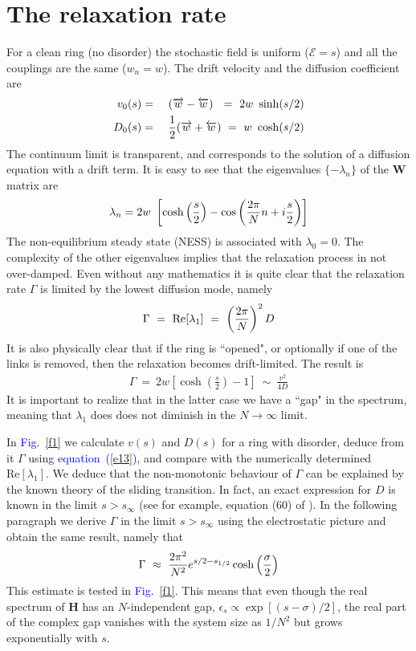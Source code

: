 \documentclass[aps,pre,floats,floatfix,twocolumn]{revtex4}
\newcommand{\re}{\mbox{Re}}
\newcommand{\ola}{\protect\overleftarrow}
\newcommand{\ora}{\protect\overrightarrow}
\newcommand{\be}[1]{\begin{eqnarray}\ifthenelse{#1=-1}{\nonumber}{\ifthenelse{#1=0}{}{\label{e#1}}}}
\newcommand{\beq}{\begin{eqnarray}}
\newcommand{\eeq}{\end{eqnarray}}
\newcommand{\Eq}[1]{\textcolor{blue}{{equation}\!~(\ref{#1})}}
\newcommand{\Fig}[1]{\textcolor{blue}{Fig.}\!\!~\ref{#1}}
\begin{document}
\section{The relaxation rate}

For a clean ring (no disorder) the stochastic field is uniform ($\mathcal{E}=s$) 
and all the couplings are the same ($w_n=w$). 
The drift velocity and the diffusion coefficient are
%
\beq
v_0(s) &=& \ (\ora{w}-\ola{w}) \ \ = \ 2w \ \sinh(s/2) \\
D_0(s) &=& \frac{1}{2}(\ora{w}+\ola{w}) \ = \ w \ \cosh(s/2)
\eeq  
%
The continuum limit is transparent, and corresponds 
to the solution of a diffusion equation with a drift term.
%
It is easy to see that the eigenvalues ${\{ -\lambda_n \}}$ of the $\bm{W}$ matrix are  
%
\be{12}
\lambda_n = 2w \ \left[ \cosh\left(\frac{s}{2}\right)-\cos\left(\frac{2\pi}{N}n + i\frac{s}{2}\right)\right]
\eeq
%
The non-equilibrium steady state (NESS) is associated with ${\lambda_0=0}$.
The complexity of the other eigenvalues implies 
that the relaxation process in not over-damped. 
%
Even without any mathematics it is quite clear that 
the relaxation rate $\Gamma$ is limited by the lowest diffusion mode, 
namely 
%
\be{13}
\Gamma \ = \ \re[\lambda_1] \ = \ \left(\frac{2\pi}{N}\right)^2 D 
\eeq   
%
It is also physically clear that if the ring is ``opened", 
or optionally if one of the links is removed, then the relaxation 
becomes drift-limited. The result is 
%
\beq
\Gamma \ = \ 2w \left[\cosh\left(\frac{s}{2}\right)-1\right] \ \sim \ \frac{v^2}{4D} 
\eeq  
%
It is important to realize that in the latter case we 
have a ``gap" in the spectrum, meaning that $\lambda_1$ does   
does not diminish in the ${N\rightarrow \infty}$ limit.  

In \Fig{f1} we calculate $v(s)$ and $D(s)$ for a ring with disorder, 
deduce from it $\Gamma$ using \Eq{e13}, and compare with the numerically 
determined $\re[\lambda_1]$. We deduce that the non-monotonic behaviour of $\Gamma$ 
can be explained by the known theory of the sliding transition.  
In fact, an exact expression for $D$ is known in the limit $s>s_{\infty}$ (see for example, equation (60) of \cite{nes}).
In the following paragraph we derive $\Gamma$  in the limit $s>s_{\infty}$ using the electrostatic picture and obtain 
the same result, namely that 
%
\be{52}
\Gamma  \ \approx \ \frac{ 2\pi^2 }{N^2} e^{s/2-s_{1/2}}\cosh\left(\frac{\sigma}{2}\right)
\eeq
%
This estimate is tested in \Fig{f1}.
This means that even though the real spectrum of  $\bm{H}$ has an $N$-independent gap, ${\epsilon_s \propto \exp[(s-\sigma)/2]}$, 
the real part of the complex gap vanishes with the system size as $1/N^2$ but grows exponentially with $s$.
\end{document}
